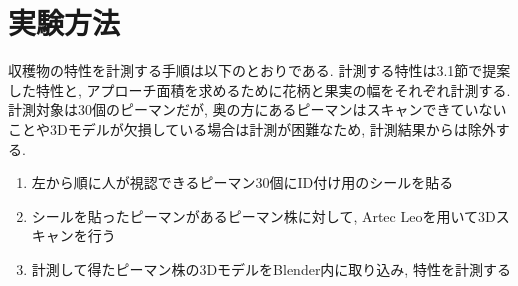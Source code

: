 \section{実験方法}
収穫物の特性を計測する手順は以下のとおりである.
計測する特性は3.1節で提案した特性と, アプローチ面積を求めるために花柄と果実の幅をそれぞれ計測する.
計測対象は30個のピーマンだが, 奥の方にあるピーマンはスキャンできていないことや3Dモデルが欠損している場合は計測が困難なため, 計測結果からは除外する.
\begin{enumerate}
  \item 左から順に人が視認できるピーマン30個にID付け用のシールを貼る
  \item シールを貼ったピーマンがあるピーマン株に対して, Artec Leoを用いて3Dスキャンを行う
  \item 計測して得たピーマン株の3DモデルをBlender内に取り込み, 特性を計測する
\end{enumerate}